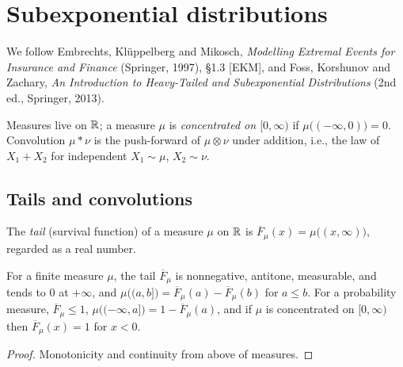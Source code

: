\chapter{Subexponential distributions}

We follow Embrechts, Klüppelberg and Mikosch, \emph{Modelling Extremal Events for Insurance
and Finance} (Springer, 1997), \S1.3 [EKM], and Foss, Korshunov and Zachary, \emph{An
Introduction to Heavy-Tailed and Subexponential Distributions} (2nd ed., Springer, 2013).

Measures live on $\mathbb{R}$; a measure $\mu$ is \emph{concentrated on $[0, \infty)$} if
$\mu\big((-\infty, 0)\big) = 0$. Convolution $\mu * \nu$ is the push-forward of
$\mu \otimes \nu$ under addition, i.e., the law of $X_1 + X_2$ for independent
$X_1 \sim \mu$, $X_2 \sim \nu$.

\section{Tails and convolutions}

\begin{definition}
  \label{def:tail}
  \leanok
  The \emph{tail} (survival function) of a measure $\mu$ on $\mathbb{R}$ is
  $\overline{F}_\mu(x) = \mu\big( (x, \infty) \big)$, regarded as a real number.
\end{definition}

\begin{lemma}
  \label{lem:tail-basic}
  \leanok
  For a finite measure $\mu$, the tail $\overline{F}_\mu$ is nonnegative, antitone, measurable,
  and tends to $0$ at $+\infty$, and $\mu\big( (a, b] \big) = \overline{F}_\mu(a) - \overline{F}_\mu(b)$
  for $a \le b$. For a probability measure, $\overline{F}_\mu \le 1$,
  $\mu\big( (-\infty, a] \big) = 1 - \overline{F}_\mu(a)$, and if $\mu$ is concentrated on
  $[0,\infty)$ then $\overline{F}_\mu(x) = 1$ for $x < 0$.
\end{lemma}
\begin{proof}
  \leanok
  Monotonicity and continuity from above of measures.
\end{proof}


